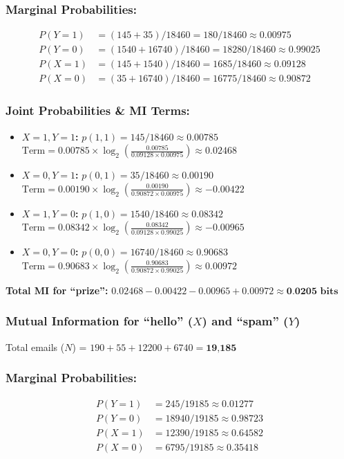 \documentclass[twoside, 10pt]{article}
\begin{document}
\subsubsection{Marginal Probabilities:}
\begin{align*}
    P(Y=1) &= (145 + 35) / 18460 = 180 / 18460 \approx 0.00975 \\
    P(Y=0) &= (1540 + 16740) / 18460 = 18280 / 18460 \approx 0.99025 \\
    P(X=1) &= (145 + 1540) / 18460 = 1685 / 18460 \approx 0.09128 \\
    P(X=0) &= (35 + 16740) / 18460 = 16775 / 18460 \approx 0.90872
\end{align*}
\subsubsection{Joint Probabilities \& MI Terms:}
\begin{itemize}
    \item \textbf{$X=1, Y=1$:} $p(1,1) = 145 / 18460 \approx 0.00785$ \\
    $\text{Term} = 0.00785 \times \log_2 \left( \frac{0.00785}{0.09128 \times 0.00975} \right) \approx 0.02468$
    \item \textbf{$X=0, Y=1$:} $p(0,1) = 35 / 18460 \approx 0.00190$ \\
    $\text{Term} = 0.00190 \times \log_2 \left( \frac{0.00190}{0.90872 \times 0.00975} \right) \approx -0.00422$
    \item \textbf{$X=1, Y=0$:} $p(1,0) = 1540 / 18460 \approx 0.08342$ \\
    $\text{Term} = 0.08342 \times \log_2 \left( \frac{0.08342}{0.09128 \times 0.99025} \right) \approx -0.00965$
    \item \textbf{$X=0, Y=0$:} $p(0,0) = 16740 / 18460 \approx 0.90683$ \\
    $\text{Term} = 0.90683 \times \log_2 \left( \frac{0.90683}{0.90872 \times 0.99025} \right) \approx 0.00972$
\end{itemize}
\textbf{Total MI for ``prize'':} $0.02468 - 0.00422 - 0.00965 + 0.00972 \approx \textbf{0.0205 bits}$
\subsubsection{Mutual Information for ``hello'' \texorpdfstring{($X$)}{(X)} and ``spam'' \texorpdfstring{($Y$)}{(Y)}}
Total emails ($N$) = $190 + 55 + 12200 + 6740 = \textbf{19,185}$
\subsubsection{Marginal Probabilities:}
\begin{align*}
    P(Y=1) &= 245 / 19185 \approx 0.01277 \\
    P(Y=0) &= 18940 / 19185 \approx 0.98723 \\
    P(X=1) &= 12390 / 19185 \approx 0.64582 \\
    P(X=0) &= 6795 / 19185 \approx 0.35418
\end{align*}
\end{document}
